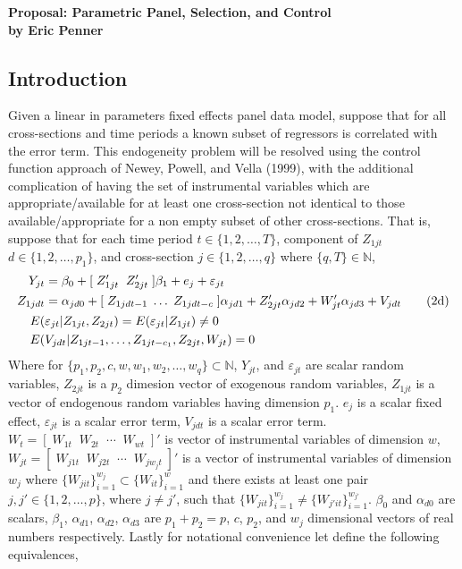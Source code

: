 \documentclass[10pt]{article}
\begin{document}
\doublespacing
\begin{center} 
\Large \bf Proposal: Parametric Panel, Selection, and Control \\
 \large by Eric Penner \rm
\end{center} 


\subsection*{Introduction } 
\noindent Given a linear in parameters fixed effects panel data model, suppose that for all cross-sections and time periods a known subset of regressors is correlated with the error term. This endogeneity problem will be resolved using the control function approach of Newey, Powell, and Vella (1999), with the additional complication of having the set of instrumental variables which are appropriate/available for at least one cross-section  not identical to those available/appropriate for a non empty subset of other cross-sections. That is, suppose that for each time period $t \in \{1,2, \ldots, T\}$, component of $Z_{1jt}$ $ d\in \{1,2, \ldots , p_1\}$, and cross-section $j \in \{1,2,\ldots, q\}$ where $\{q,T\} \in \mathbb{N}$, 
\begin{align} 
Y_{jt} &= \beta_0 + [\; Z_{1jt}' \;\; Z_{2jt}' \;] \beta_1 + e_j + \varepsilon_{jt} \\
%
Z_{1jdt} &= \alpha_{jd0} + [\; Z_{1jdt-1} \; \ldots \; Z_{1jdt-c} \; ] \alpha_{jd1} + Z_{2jt}' \alpha_{jd2} + W_{jt}' \alpha_{jd3} + V_{jdt} \tag{2d} \\
%
\addtocounter {equation} {1}
E(&\varepsilon_{jt} | Z_{1jt} , Z_{2jt}) = E(\varepsilon_{jt} | Z_{1jt}) \neq 0  \\
%
E(& V_{jdt} | Z_{1jt-1},\ldots,Z_{1jt-c_1},Z_{2jt},W_{jt}) = 0 
%
\end{align}
Where for $\{p_1,p_2,c,w,w_1,w_2, \ldots ,w_q \} \subset \mathbb{N}$, $Y_{jt}$, and $\varepsilon_{jt}$ are scalar random variables, $ Z_{2jt}$ is a $p_2$ dimesion vector of exogenous random variables, $Z_{1jt}$  is a vector of endogenous random variables having dimension $p_1$. $e_j$ is a scalar fixed effect, $\varepsilon_{jt}$ is a scalar error term, $V_{jdt}$ is a scalar error term. $W_t = [ \; W_{1t} \;\; W_{2t} \;\; \cdots \;\; W_{wt} \;]'$ is vector of instrumental variables of dimension $w$, $W_{jt} = [\;W_{j1t} \;\; W_{j2t} \;\; \cdots \;\; W_{jw_jt} \;]'$ is a vector of instrumental variables of dimension $w_j$ where $\{W_{jit}\}_{i=1}^{w_j} \subset \{W_{it}\}_{i=1}^{w}$ and there exists at least one pair $j,j'  \in \{1,2, \ldots , p\}$, where $j \neq j'$, such that $\{W_{jit}\}_{i=1}^{w_j} \neq \{W_{j'it}\}_{i=1}^{w_{j'}}$. $\beta_0$ and $\alpha_{d0}$  are scalars, $\beta_1$, $\alpha_{d1}$, $\alpha_{d2}$, $\alpha_{d3}$ are $p_1 +p_2 = p$, $c$, $p_2$, and $w_j$ dimensional vectors of real numbers respectively. Lastly for notational convenience let define the following equivalences, 
\end{document}
